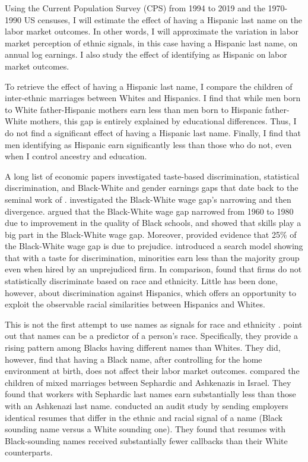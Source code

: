 \documentclass[12pt, fullpage]{article}
\begin{document}
Using the Current Population Survey (CPS) from 1994 to 2019 and the 1970-1990 US censuses, I will estimate the effect of having a Hispanic last name on the labor market outcomes. In other words, I will approximate the variation in labor market perception of ethnic signals, in this case having a Hispanic last name, on annual log earnings. I also study the effect of identifying as Hispanic on labor market outcomes. 

To retrieve the effect of having a Hispanic last name, I compare the children of inter-ethnic marriages between Whites and Hispanics. I find that while men born to White father-Hispanic mothers earn less than men born to Hispanic father-White mothers, this gap is entirely explained by educational differences. Thus, I do not find a significant effect of having a Hispanic last name. Finally, I find that men identifying as Hispanic earn significantly less than those who do not, even when I control ancestry and education. 

A long list of economic papers investigated taste-based discrimination, statistical discrimination, and Black-White and gender earnings gaps that date back to the seminal work of \citet{becker2010economics}. \citet{bayer2018divergent} investigated the Black-White wage gap's narrowing and then divergence. \citet{card1992school} argued that the Black-White wage gap narrowed from 1960 to 1980 due to improvement in the quality of Black schools, and \citet{juhn1991accounting} showed that skills play a big part in the Black-White wage gap. Moreover,  \citet{charles2008prejudice} provided evidence that 25\% of the Black-White wage gap is due to prejudice. \citet{black1995discrimination} introduced a search model showing that with a taste for discrimination, minorities earn less than the majority group even when hired by an unprejudiced firm. In comparison, \citet{altonji2001employer} found that firms do not statistically discriminate based on race and ethnicity. Little has been done, however, about discrimination against Hispanics, which offers an opportunity to exploit the observable racial similarities between Hispanics and Whites.

This is not the first attempt to use names as signals for race and ethnicity \citep{fryer2004causes, rubinstein2014pride, bertrand2004emily}. \citet{fryer2004causes} point out that names can be a predictor of a person's race. Specifically, they provide a rising pattern among Blacks having different names than Whites. They did, however, find that having a Black name, after controlling for the home environment at birth, does not affect their labor market outcomes. \citet{rubinstein2014pride} compared the children of mixed marriages between Sephardic and Ashkenazis in Israel. They found that workers with Sephardic last names earn substantially less than those with an Ashkenazi last name. \citet{bertrand2004emily} conducted an audit study by sending employers identical resumes that differ in the ethnic and racial signal of a name (Black sounding name versus a White sounding one). They found that resumes with Black-sounding names received substantially fewer callbacks than their White counterparts. 
\end{document}
